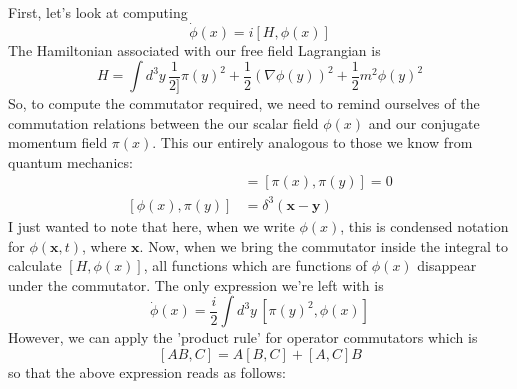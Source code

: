 \documentclass[11pt, oneside]{article}   	%
\theoremstyle{newline}
\theoremstyle{newline}
\theoremstyle{newline}
\theoremstyle{newline}
\theoremstyle{newline}
\begin{document}
First, let's look at computing 
\[ \dot{\phi}(x)  = i [ H, \phi(x) ] \] 
The Hamiltonian associated with our free field Lagrangian is \[ H = \int d^3 y \, \frac{1}{2]} \pi(y)^2 + \frac{1}{2} ( \nabla \phi(y))^2 + \frac{1}{2} m^2 \phi(y)^2 \] 
So, to compute the commutator required, we need to remind ourselves of the commutation relations between the our scalar field $\phi(x)$ and our conjugate momentum field $\pi(x)$.  This our entirely analogous to those we know from quantum mechanics: 
\begin{align*} 
[\phi(x), \phi(y) ] &= [ \pi(x), \pi(y) ] = 0 \\
[\phi(x), \pi(y) ] & = \delta^3 (\mathbf{x} - \mathbf{y}) 
\end{align*} 
I just wanted to note that here, when we write $\phi( x)$, this is condensed notation for $\phi( \mathbf{x}, t )$, where $\mathbf{x}$. Now, when we bring the commutator inside the integral to calculate $[H, \phi(x) ] $, all functions which are functions of $\phi (x) $ disappear under the commutator. The only expression we're left with is 
\[ \dot{\phi}(x) = \frac{i}{2} \int d^3 y \, [ \pi(y)^2, \phi(x) ] \] 
However, we can apply the 'product rule' for operator commutators which is \[ [AB, C] = A[B, C] + [A, C]B \] 
so that the above expression reads as follows: 
\end{document}
